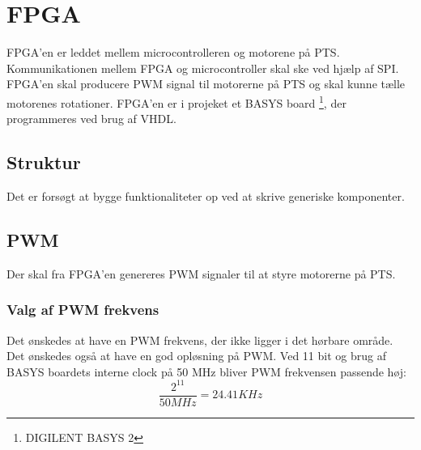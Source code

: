 \section{FPGA}
\label{sec:FPGA}

FPGA'en er leddet mellem microcontrolleren og motorene på PTS. 
Kommunikationen mellem FPGA og microcontroller skal ske ved hjælp af SPI. 
FPGA'en skal producere PWM signal til motorerne på PTS og skal kunne tælle motorenes rotationer. 
FPGA'en er i projeket et BASYS board \footnote{DIGILENT BASYS 2}, der programmeres ved brug af VHDL.

\subsection{Struktur}
Det er forsøgt at bygge funktionaliteter op ved at skrive generiske komponenter. 

\subsection{PWM}
Der skal fra FPGA'en genereres PWM signaler til at styre motorerne på PTS.
\subsubsection*{Valg af PWM frekvens}
Det ønskedes at have en PWM frekvens, der ikke ligger i det hørbare område. 
Det ønskedes også at have en god opløsning på PWM. 
Ved 11 bit og brug af BASYS boardets interne clock på 50 MHz bliver PWM frekvensen passende høj:
\begin{equation}
  \frac{2^{11}}{50 MHz} = 24.41 KHz 
\end{equation}